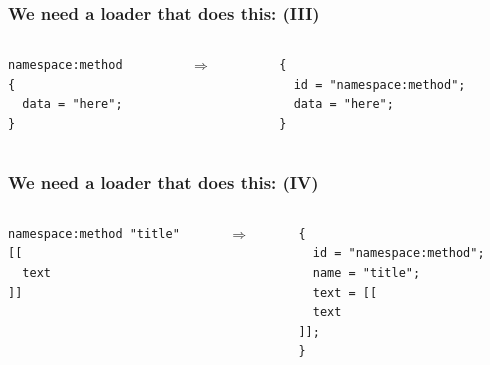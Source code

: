 \documentclass[handout]{beamer}
\begin{document}

\begin{frame}[fragile]

\frametitle{We need a loader that does this: (III)}

\begin{columns}

\begin{column}{0.5\textwidth}
\begin{verbatim}
namespace:method
{
  data = "here";
}
\end{verbatim}
\end{column}

\begin{column}{0.05\textwidth}
$\Rightarrow$
\end{column}

\begin{column}{0.5\textwidth}
\begin{verbatim}
{
  id = "namespace:method";
  data = "here";
}
\end{verbatim}
\end{column}

\end{columns}

\end{frame}


\begin{frame}[fragile]

\frametitle{We need a loader that does this: (IV)}

\begin{columns}

\begin{column}{0.5\textwidth}
\begin{verbatim}
namespace:method "title"
[[
  text
]]
\end{verbatim}
\end{column}

\begin{column}{0.05\textwidth}
$\Rightarrow$
\end{column}

\begin{column}{0.5\textwidth}
\begin{verbatim}
{
  id = "namespace:method";
  name = "title";
  text = [[
  text
]];
}
\end{verbatim}
\end{column}

\end{columns}

\end{frame}
\end{document}

